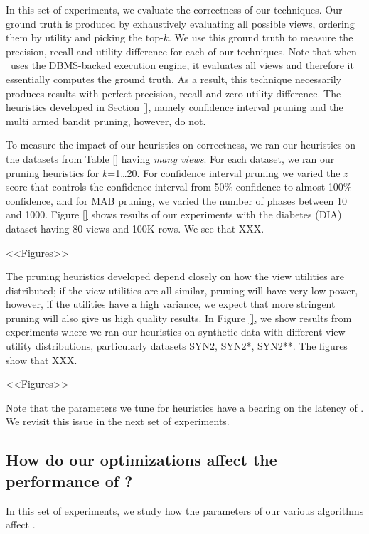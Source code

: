 In this set of experiments, we evaluate the correctness of our techniques.
Our ground truth is produced by exhaustively
evaluating all possible views, ordering them by utility and picking the top-$k$. 
We use this ground truth to measure the precision, recall and
utility difference for each of our techniques.
Note that when \VizRecDB\ uses the DBMS-backed execution engine, it
evaluates all views and therefore it essentially computes the ground truth.
As a result, this technique necessarily produces results with perfect precision,
recall and zero utility difference.
The heuristics developed in Section \ref{}, namely
confidence interval pruning and the multi armed bandit pruning, however, do not.

To measure the impact of our heuristics on correctness, we ran our heuristics on
the datasets from Table \ref{} having {\it many views}. 
For each dataset, we ran our pruning heuristics for $k$=1\ldots 20. 
For confidence interval pruning we varied the $z$ score that controls the
confidence interval from 50\% confidence to almost 100\% confidence, and for MAB
pruning, we varied the number of phases between 10 and 1000.
Figure \ref{} shows results of our experiments with the diabetes (DIA) dataset
having 80 views and 100K rows. We see that XXX.


<<Figures>>

The pruning heuristics developed depend closely on how the view utilities are
distributed; if the view utilities are all similar, pruning will have very low
power, however, if the utilities have a high variance, we expect that more
stringent pruning will also give us high quality results.
In Figure \ref{}, we show results from experiments where we ran our heuristics
on synthetic data with different view utility distributions, particularly
datasets SYN2, SYN2*, SYN2**. The figures show that XXX.

<<Figures>>

Note that the parameters we tune for heuristics have a bearing on the latency of
\VizRecDB. We revisit this issue in the next set of experiments.


\subsection{How do our optimizations affect the performance of
\VizRecDB?}
\label{sec:expt_accuracy}

In this set of experiments, we study how the parameters of our various
algorithms affect \VizRecDB. 

